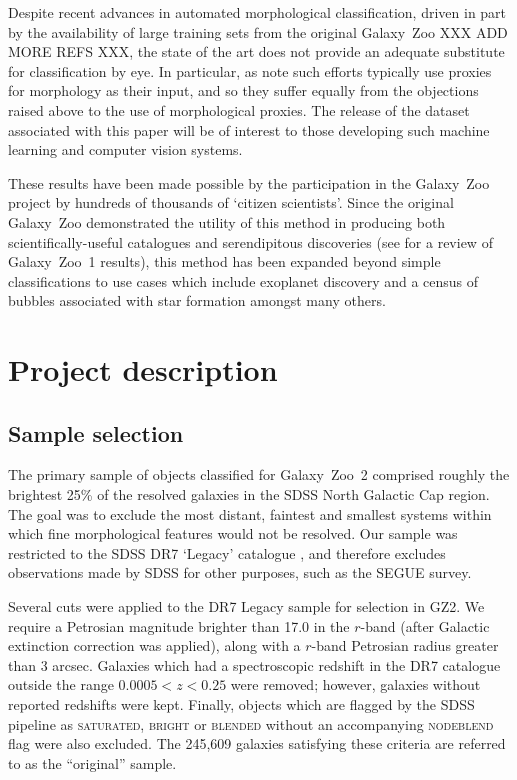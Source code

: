 \documentclass[useAMS,usenatbib]{mn2e}
\begin{document}
Despite recent advances in automated morphological classification, driven in part by the availability of large training sets from the original Galaxy~Zoo \citep{ban10,hue11,dav13} XXX ADD MORE REFS XXX, the state of the art does not provide an adequate substitute for classification by eye. In particular, as \citet{lin11} note such efforts typically use proxies for morphology as their input, and so they suffer equally from the objections raised above to the use of morphological proxies. The release of the dataset associated with this paper will be of interest to those developing such machine learning and computer vision systems. 

These results have been made possible by the participation in the Galaxy~Zoo project by hundreds of thousands of `citizen scientists'. Since the original Galaxy~Zoo demonstrated the utility of this method in producing both scientifically-useful catalogues and serendipitous discoveries (see \citet{lin11} for a review of Galaxy~Zoo~1 results), this method has been expanded beyond simple classifications to  use cases which include exoplanet discovery \citep{fis12,sch12} and a census of bubbles associated with star formation \citep{sim12a} amongst many others. 


\section{Project description} \label{sec-description}

\subsection{Sample selection} \label{ssec-sample}
The primary sample of objects classified for Galaxy~Zoo~2 comprised roughly the brightest 25\% of the resolved galaxies in the SDSS North Galactic Cap region. The goal was to exclude the most distant, faintest and smallest systems within which fine morphological features would not be resolved. Our sample was restricted to the SDSS DR7 `Legacy' catalogue \citep{aba09}, and therefore excludes observations made by SDSS for other purposes, such as the SEGUE survey. 

Several cuts were applied to the DR7 Legacy sample for selection in GZ2. We require a Petrosian magnitude brighter than 17.0 in the $r$-band (after Galactic extinction correction was applied), along with a $r$-band Petrosian radius greater than 3 arcsec. Galaxies which had a spectroscopic redshift in the DR7 catalogue outside the range $0.0005<z<0.25$ were removed; however, galaxies without reported redshifts were kept. Finally, objects which are flagged by the SDSS pipeline as \textsc{saturated}, \textsc{bright} or \textsc{blended} without an accompanying \textsc{nodeblend} flag were also excluded. The 245,609 galaxies satisfying these criteria are referred to as the ``original'' sample.  
\end{document}

